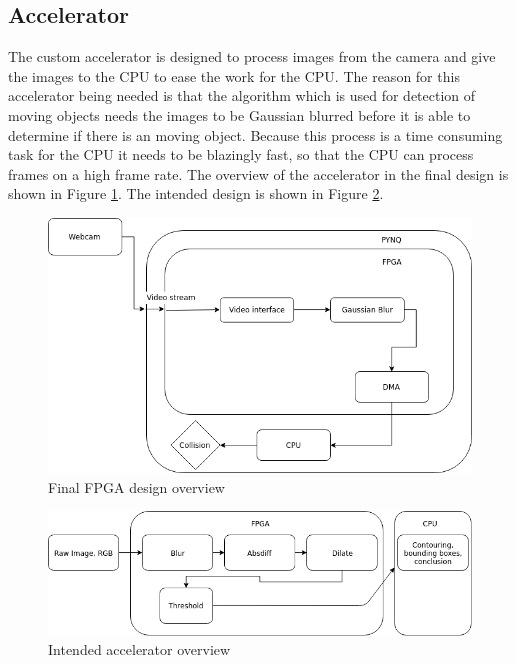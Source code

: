 \subsection{Accelerator}
The custom accelerator is designed to process images from the camera and give the images to the CPU to ease the work for the CPU. The reason for this accelerator being needed is that the algorithm which is used for detection of moving objects needs the images to be Gaussian blurred before it is able to determine if there is an moving object. Because this process is a time consuming task for the CPU it needs to be blazingly fast, so that the CPU can process frames on a high frame rate. The overview of the accelerator in the final design is shown in Figure \ref{fig:fpga1}. The intended design is shown in Figure \ref{fig:fpga2}.

\begin{figure}
    \centering
    \includegraphics[scale=0.4]{Images/PipielineFinalFinal-Page-1.png}
    \caption{Final FPGA design overview}
    \label{fig:fpga1}
\end{figure}

\begin{figure}
    \centering
    \includegraphics[scale=0.4]{Images/PipielineFinalFinal-Page-2.png}
    \caption{Intended accelerator overview}
    \label{fig:fpga2}
\end{figure}

